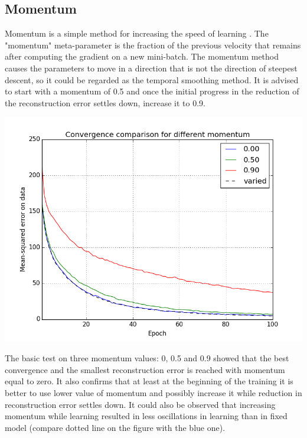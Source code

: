 \documentclass[a4paper]{scrartcl}
\begin{document}
\subsection{Momentum}
Momentum is a simple method for increasing the speed of learning \cite{Hinton}. The "momentum" meta-parameter is the fraction of the previous velocity that remains after computing the gradient on a new mini-batch. The momentum method causes the parameters to move in a direction that is not the direction of steepest descent, so it could be regarded as the temporal smoothing method. It is advised \cite{Hinton} to start with a momentum of 0.5 and once the initial progress in the reduction of the reconstruction error settles down, increase it to 0.9. 
\begin{center}
\includegraphics[width=14cm]{images/momentum_var.png}
\end{center}
The basic test on three momentum values: 0, 0.5 and 0.9 showed that the best convergence and the smallest reconstruction error is reached with momentum equal to zero. It also confirms that at least at the beginning of the training it is better to use lower value of momentum and possibly increase it while reduction in reconstruction error settles down. It could also be observed that increasing momentum while learning resulted in less oscillations in learning than in fixed model (compare dotted line on the figure with the blue one).
\end{document}
